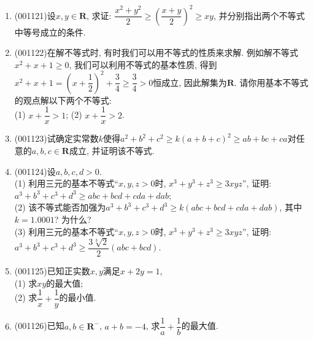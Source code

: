 \documentclass[10pt,a4paper]{article}
\newcommand{\blank}[1]{\underline{\hbox to #1pt{}}}
\begin{document}
\begin{enumerate}[1.]
\blank{30}(1) 当$x<0$时, $x+\dfrac{1}{x}\le -2$;\\ 
\blank{30}(2) 当$x>0$时, $x+\dfrac{1}{x}\ge 2$;\\ 
\blank{30}(3) 当$x>0$时, $x^2+\dfrac{1}{x}\ge 2\sqrt{x}$;\\ 
\blank{30}(4) 当$a,b\ge 0$时, $a+b\ge 2ab$;\\ 
\blank{30}(5) 当$a,b\ge 0$时, $2ab\ge a+b$;\\ 
\blank{30}(6) 当$x,y,z\in \mathbf{R}$时, $x^2+y^2+z^2\ge 2xy+yz$;\\ 
\blank{30}(7) 当$a,b\in \mathbf{R}$时, $a^2+b^2+4\ge ab+2a+2b$;\\ 
\blank{30}(8) 当$a,b\in \mathbf{R}$时, $a^3+b^3\ge 2a^2b$;\\ 
\blank{30}(9) 当$a,b \in \mathbf{R}$时, $a^3+b^3\ge a^2b+ab^2$;\\ 
\blank{30}(10) 当$a,b\in \mathbf{R}^+$时, $a^3+b^3\ge a^2b+ab^2$;\\ 
\blank{30}(11) 当$x,y>0$时, $x^2+y^2\ge (x+y)^2$;
\item {\tiny (001121)}设$x,y\in \mathbf{R}$, 求证:  $\dfrac{x^2+y^2}{2}\ge(\dfrac{x+y}{2})^2\ge xy$, 并分别指出两个不等式中等号成立的条件.
\item {\tiny (001122)}在解不等式时, 有时我们可以用不等式的性质来求解. 例如解不等式$x^2+x+1\ge 0$, 我们可以利用不等式的基本性质, 得到$x^2+x+1=\left(x+\dfrac{1}{2}\right)^2+\dfrac{3}{4}\ge\dfrac{3}{4}>0$恒成立, 因此解集为$\mathbf{R}$. 请你用基本不等式的观点解以下两个不等式:\\ 
(1) $x+\dfrac{1}{x}>1$; \hfill (2) $x+\dfrac{1}{x}>2$. \hfill
\item {\tiny (001123)}试确定实常数$k$使得$a^2+b^2+c^2\geq k(a+b+c)^2\geq ab+bc+ca$对任意的$a,b,c\in \mathbf{R}$成立, 并证明该不等式.
\item {\tiny (001124)}设$a,b,c,d>0$.\\ 
(1) 利用三元的基本不等式``$x,y,z>0$时, $x^3+y^3+z^3\ge 3xyz$'', 证明: $a^3+b^3+c^3+d^3\geq abc+bcd+cda+dab$;\\ 
(2) 该不等式能否加强为$a^3+b^3+c^3+d^3\ge k(abc+bcd+cda+dab)$, 其中$k=1.0001$? 为什么?\\ 
(3) 利用三元的基本不等式``$x,y,z>0$时, $x^3+y^3+z^3\ge 3xyz$'', 证明: $a^3+b^3+c^3+d^3\geq \dfrac{3\sqrt[3]{2}}{2}(abc+bcd)$.
\item {\tiny (001125)}已知正实数$x,y$满足$x+2y=1$,\\ 
(1) 求$xy$的最大值;\\ 
(2) 求$\dfrac{1}{x}+\dfrac{1}{y}$的最小值.
\item {\tiny (001126)}已知$a,b\in \mathbf{R}^-$, $a+b=-4$, 求$\dfrac{1}{a}+\dfrac{1}{b}$的最大值.

\end{enumerate}
\end{document}
